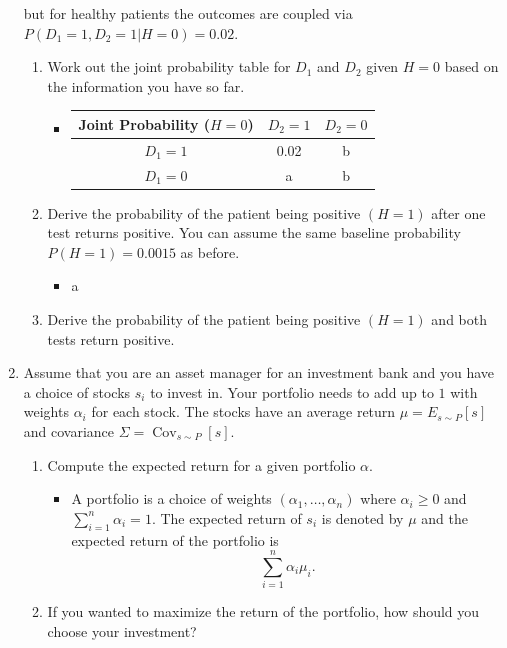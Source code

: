 \documentclass{article}
\begin{document}
\begin{enumerate}
$$	$$
	but for healthy patients the outcomes are coupled via $P(D_1 = 1, D_2 = 1| H = 0) = 0.02$.
	\begin{enumerate}
		\item Work out the joint probability table for $D_1$ and $D_2$ given $H = 0$ based on the information you have so far.
			\begin{itemize}
				\item
					\begin{center}
						\begin{tabular}{|c|c|c|} \hline
						Joint Probability ($H = 0$) & $D_2 = 1$ & $D_2 = 0$ \\ \hline
						$D_1 = 1$ & 0.02 & b \\ \hline
						$D_1 = 0$ & a & b \\ \hline
						\end{tabular}
					\end{center}
			\end{itemize}
		\item Derive the probability of the patient being positive $(H = 1)$ after one test returns positive. You can assume the same baseline probability $P(H = 1) = 0.0015$ as before.
			\begin{itemize}
				\item a
			\end{itemize}
		\item Derive the probability of the patient being positive $(H = 1)$ and both tests return positive.
	\end{enumerate}
	\item Assume that you are an asset manager for an investment bank and you have a choice of stocks $s_i$ to invest in. Your portfolio needs to add up to $1$ with weights $\alpha_i$ for each stock. The stocks have an average return $\mu = E_{s \sim P}[s]$ and covariance $\Sigma = \operatorname{Cov}_{s \sim P}[s]$.
		\begin{enumerate}
			\item Compute the expected return for a given portfolio $\alpha$.
				\begin{itemize}
					\item A portfolio is a choice of weights $(\alpha_1, \dots, \alpha_n)$ where $\alpha_i \geq 0$ and $\sum_{i = 1}^n \alpha_i = 1$. The expected return of $s_i$ is denoted by $\mu$ and the expected return of the portfolio is
					$$
					\sum_{i = 1}^n \alpha_i \mu_i.
					$$
				\end{itemize}
			\item If you wanted to maximize the return of the portfolio, how should you choose your investment?

\end{enumerate}
\end{enumerate}
\end{document}
